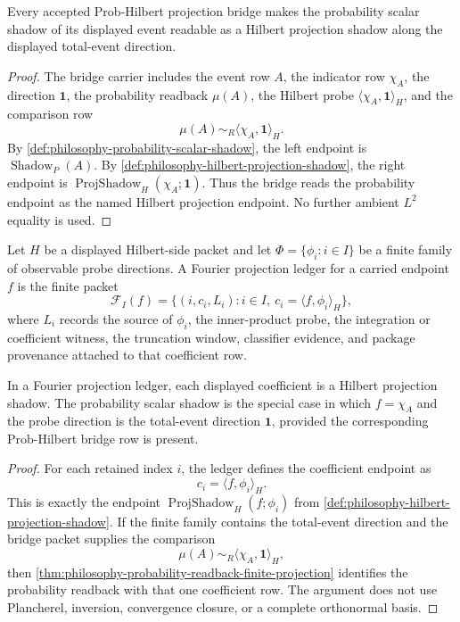 \begin{theorem}
\label{thm:philosophy-probability-readback-finite-projection}
Every accepted Prob-Hilbert projection bridge makes the probability scalar
shadow of its displayed event readable as a Hilbert projection shadow along
the displayed total-event direction.
\end{theorem}
\begin{proof}
The bridge carrier includes the event row $A$, the indicator row $\chi_A$,
the direction $\mathbf 1$, the probability readback $\mu(A)$, the Hilbert
probe $\langle \chi_A,\mathbf 1\rangle_H$, and the comparison row
$$
\mu(A)\sim_R\langle \chi_A,\mathbf 1\rangle_H .
$$
By \autoref{def:philosophy-probability-scalar-shadow}, the left endpoint is
$\operatorname{Shadow}_{P}(A)$. By
\autoref{def:philosophy-hilbert-projection-shadow}, the right endpoint is
$\operatorname{ProjShadow}_{H}(\chi_A;\mathbf 1)$. Thus the bridge reads the
probability endpoint as the named Hilbert projection endpoint. No further
ambient $L^2$ equality is used.
\end{proof}

\begin{definition}
\label{def:philosophy-fourier-projection-ledger}
Let $H$ be a displayed Hilbert-side packet and let
$\Phi=\{\phi_i:i\in I\}$ be a finite family of observable probe directions.
A Fourier projection ledger for a carried endpoint $f$ is the finite packet
$$
\mathcal F_I(f)=\{(i,c_i,L_i):i\in I,\ c_i=\langle f,\phi_i\rangle_H\},
$$
where $L_i$ records the source of $\phi_i$, the inner-product probe, the
integration or coefficient witness, the truncation window, classifier
evidence, and package provenance attached to that coefficient row.
\end{definition}

\begin{theorem}
\label{thm:philosophy-fourier-coefficients-projection-shadows}
In a Fourier projection ledger, each displayed coefficient is a Hilbert
projection shadow. The probability scalar shadow is the special case in
which $f=\chi_A$ and the probe direction is the total-event direction
$\mathbf 1$, provided the corresponding Prob-Hilbert bridge row is present.
\end{theorem}
\begin{proof}
For each retained index $i$, the ledger defines the coefficient endpoint as
$$
c_i=\langle f,\phi_i\rangle_H .
$$
This is exactly the endpoint
$\operatorname{ProjShadow}_{H}(f;\phi_i)$ from
\autoref{def:philosophy-hilbert-projection-shadow}. If the finite family
contains the total-event direction and the bridge packet supplies the
comparison
$$
\mu(A)\sim_R\langle \chi_A,\mathbf 1\rangle_H ,
$$
then \autoref{thm:philosophy-probability-readback-finite-projection}
identifies the probability readback with that one coefficient row. The
argument does not use Plancherel, inversion, convergence closure, or a
complete orthonormal basis.
\end{proof}


